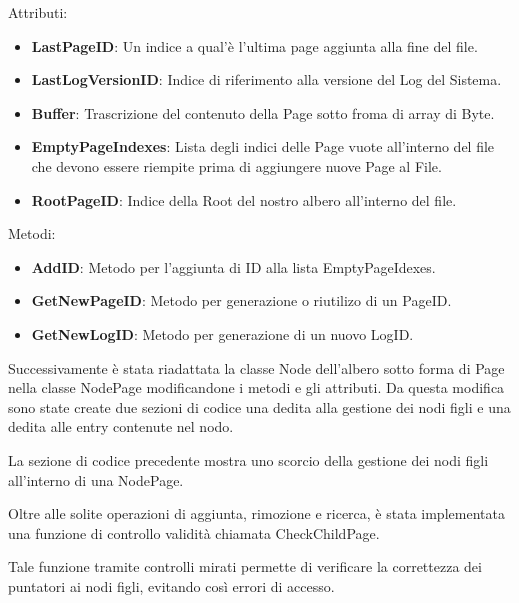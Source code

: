 \documentclass[12pt,a4paper,openright,twoside]{book}
\begin{document}
            

            Attributi:
            \begin{itemize}
                \item \textbf{LastPageID}: Un indice a qual'è l'ultima page aggiunta alla fine del file.
                \item \textbf{LastLogVersionID}: Indice di riferimento alla versione del Log del Sistema.
                \item \textbf{Buffer}: Trascrizione del contenuto della Page sotto froma di array di Byte.
                \item \textbf{EmptyPageIndexes}: Lista degli indici delle Page vuote all'interno del file che devono essere riempite prima di aggiungere nuove Page al File.
                \item \textbf{RootPageID}: Indice della Root del nostro albero all'interno del file.
            \end{itemize}

            Metodi:
            \begin{itemize}
                \item \textbf{AddID}: Metodo per l'aggiunta di ID alla lista EmptyPageIdexes.
                \item \textbf{GetNewPageID}: Metodo per generazione o riutilizo di un PageID.
                \item \textbf{GetNewLogID}: Metodo per generazione di un nuovo LogID.
            \end{itemize}

            Successivamente è stata riadattata la classe Node dell'albero sotto forma di Page nella classe NodePage modificandone i metodi e gli attributi.
            Da questa modifica sono state create due sezioni di codice una dedita alla gestione dei nodi figli e una dedita alle entry contenute nel nodo.

            

            La sezione di codice precedente mostra uno scorcio della gestione dei nodi figli all'interno di una NodePage.

            Oltre alle solite operazioni di aggiunta, rimozione e ricerca, è stata implementata una funzione di controllo validità chiamata CheckChildPage.

            Tale funzione tramite controlli mirati permette di verificare la correttezza dei puntatori ai nodi figli, evitando così errori di accesso.
\end{document}
